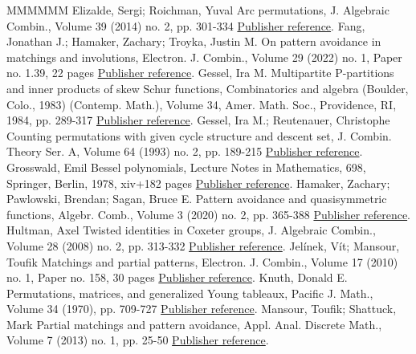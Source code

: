 \documentclass[11pt]{article}
\theoremstyle{definition}
\numberwithin{equation}{section}
\begin{document}
\begin{thebibliography}{MMMMMM}
 Elizalde, Sergi; Roichman, Yuval Arc permutations, J. Algebraic Combin., Volume 39 (2014) no. 2, pp. 301-334 \href{https://alco.centre-mersenne.org/articles/10.5802/alco.351/#arc_pattern_avoiding}{Publisher reference}.
 Fang, Jonathan J.; Hamaker, Zachary; Troyka, Justin M. On pattern avoidance in matchings and involutions, Electron. J. Combin., Volume 29 (2022) no. 1, Paper no. 1.39, 22 pages \href{https://alco.centre-mersenne.org/articles/10.5802/alco.351/#fang2022pattern}{Publisher reference}.
 Gessel, Ira M. Multipartite P-partitions and inner products of skew Schur functions, Combinatorics and algebra (Boulder, Colo., 1983) (Contemp. Math.), Volume 34, Amer. Math. Soc., Providence, RI, 1984, pp. 289-317 \href{https://alco.centre-mersenne.org/articles/10.5802/alco.351/#knuth_classes_schur_positive}{Publisher reference}.
 Gessel, Ira M.; Reutenauer, Christophe Counting permutations with given cycle structure and descent set, J. Combin. Theory Ser. A, Volume 64 (1993) no. 2, pp. 189-215 \href{https://alco.centre-mersenne.org/articles/10.5802/alco.351/#gessel1993counting}{Publisher reference}.
 Grosswald, Emil Bessel polynomials, Lecture Notes in Mathematics, 698, Springer, Berlin, 1978, xiv+182 pages \href{https://alco.centre-mersenne.org/articles/10.5802/alco.351/#bessel_polynomials_book}{Publisher reference}.
 Hamaker, Zachary; Pawlowski, Brendan; Sagan, Bruce E. Pattern avoidance and quasisymmetric functions, Algebr. Comb., Volume 3 (2020) no. 2, pp. 365-388 \href{https://alco.centre-mersenne.org/articles/10.5802/alco.351/#S3_patterns_list}{Publisher reference}.
 Hultman, Axel Twisted identities in Coxeter groups, J. Algebraic Combin., Volume 28 (2008) no. 2, pp. 313-332 \href{https://alco.centre-mersenne.org/articles/10.5802/alco.351/#hultman2008twisted}{Publisher reference}.
 Jelínek, Vít; Mansour, Toufik Matchings and partial patterns, Electron. J. Combin., Volume 17 (2010) no. 1, Paper no. 158, 30 pages \href{https://alco.centre-mersenne.org/articles/10.5802/alco.351/#jelinek2010matchings}{Publisher reference}.
 Knuth, Donald E. Permutations, matrices, and generalized Young tableaux, Pacific J. Math., Volume 34 (1970), pp. 709-727 \href{https://alco.centre-mersenne.org/articles/10.5802/alco.351/#knuth1970permutations}{Publisher reference}.
 Mansour, Toufik; Shattuck, Mark Partial matchings and pattern avoidance, Appl. Anal. Discrete Math., Volume 7 (2013) no. 1, pp. 25-50 \href{https://alco.centre-mersenne.org/articles/10.5802/alco.351/#mansour2013partial}{Publisher reference}.

\end{thebibliography}
\end{document}
